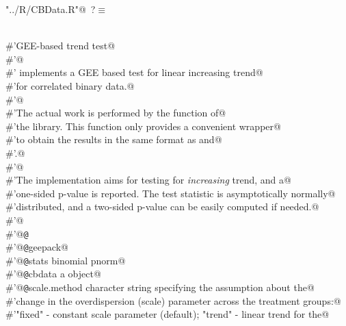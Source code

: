 \documentclass[reqno]{amsart}
\renewcommand{\NWtarget}[2]{\hypertarget{#1}{#2}}
\begin{document}
\begin{flushleft} \small\label{scrap12}\raggedright\small
\NWtarget{nuweb?}{} \verb@"../R/CBData.R"@\nobreak\ {\footnotesize {?}}$\equiv$
\vspace{-1ex}
\begin{list}{}{} \item
\mbox{}\verb@@\\
\mbox{}\verb@#'GEE-based trend test@\\
\mbox{}\verb@#'@\\
\mbox{}\verb@#' implements a GEE based test for linear increasing trend@\\
\mbox{}\verb@#'for correlated binary data.@\\
\mbox{}\verb@#'@\\
\mbox{}\verb@#'The actual work is performed by the  function of@\\
\mbox{}\verb@#'the  library. This function only provides a convenient wrapper@\\
\mbox{}\verb@#'to obtain the results in the same format as  and@\\
\mbox{}\verb@#'.@\\
\mbox{}\verb@#'@\\
\mbox{}\verb@#'The implementation aims for testing for \emph{increasing} trend, and a@\\
\mbox{}\verb@#'one-sided p-value is reported. The test statistic is asymptotically normally@\\
\mbox{}\verb@#'distributed, and a two-sided p-value can be easily computed if needed.@\\
\mbox{}\verb@#'@\\
\mbox{}\verb@#'@{\tt @}\verb@export@\\
\mbox{}\verb@#'@{\tt @}\verb@import geepack@\\
\mbox{}\verb@#'@{\tt @}\verb@importFrom stats binomial pnorm@\\
\mbox{}\verb@#'@{\tt @}\verb@param cbdata a  object@\\
\mbox{}\verb@#'@{\tt @}\verb@param scale.method character string specifying the assumption about the@\\
\mbox{}\verb@#'change in the overdispersion (scale) parameter across the treatment groups:@\\
\mbox{}\verb@#'"fixed" - constant scale parameter (default); "trend" - linear trend for the@\\

\end{list}
\end{flushleft}
\end{document}
